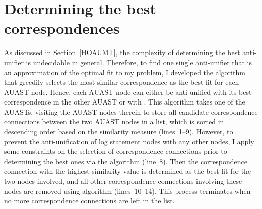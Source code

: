 







\section{Determining the best correspondences}  \label{best-corr}


As discussed in Section~\ref{HOAUMT}, the complexity of determining the best anti-unifier is undecidable in general. Therefore, to find one single anti-unifier that is an approximation of the optimal fit to my problem, I developed the  algorithm that greedily selects the most similar correspondence as the best fit for each AUAST node. Hence, each AUAST node can either be anti-unified with its best correspondence in the other AUAST or with \nothing. This algorithm takes one of the AUASTs, visiting the AUAST nodes therein to store all candidate correspondence connections between the two AUAST nodes in a list, which is sorted in descending order based on the similarity measure (lines~1--9). However, to prevent the anti-unification of log statement nodes with any other nodes, I apply some constraints on the selection of correspondence connections prior to determining the best ones via the  algorithm (line~8). Then the correspondence connection with the highest similarity value is determined as the best fit for the two nodes involved, and all other correspondence connections involving these nodes are removed using  algorithm (lines~10--14). This process terminates when no more correspondence connections are left in the list.

